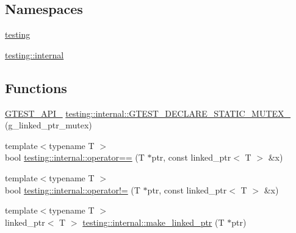 \subsection*{Namespaces}
\begin{DoxyCompactItemize}
\item 
 \hyperlink{namespacetesting}{testing}
\item 
 \hyperlink{namespacetesting_1_1internal}{testing\+::internal}
\end{DoxyCompactItemize}
\subsection*{Functions}
\begin{DoxyCompactItemize}
\item 
\hyperlink{gtest-port_8h_aa73be6f0ba4a7456180a94904ce17790}{G\+T\+E\+S\+T\+\_\+\+A\+P\+I\+\_\+} \hyperlink{namespacetesting_1_1internal_ad7c5625384cf5f6b714188f274537ef6}{testing\+::internal\+::\+G\+T\+E\+S\+T\+\_\+\+D\+E\+C\+L\+A\+R\+E\+\_\+\+S\+T\+A\+T\+I\+C\+\_\+\+M\+U\+T\+E\+X\+\_\+} (g\+\_\+linked\+\_\+ptr\+\_\+mutex)
\item 
{\footnotesize template$<$typename T $>$ }\\bool \hyperlink{namespacetesting_1_1internal_ad1cb54a206a209ddace17a05359d38ae}{testing\+::internal\+::operator==} (T $\ast$ptr, const linked\+\_\+ptr$<$ T $>$ \&x)
\item 
{\footnotesize template$<$typename T $>$ }\\bool \hyperlink{namespacetesting_1_1internal_a6910869259f8f31825b471e9190fa09a}{testing\+::internal\+::operator!=} (T $\ast$ptr, const linked\+\_\+ptr$<$ T $>$ \&x)
\item 
{\footnotesize template$<$typename T $>$ }\\linked\+\_\+ptr$<$ T $>$ \hyperlink{namespacetesting_1_1internal_a0d79fad1f772844eff35dfe955f24fd6}{testing\+::internal\+::make\+\_\+linked\+\_\+ptr} (T $\ast$ptr)
\end{DoxyCompactItemize}
